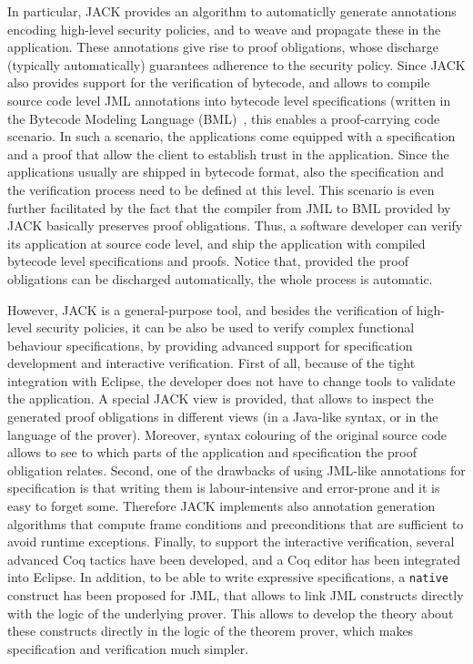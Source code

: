 In particular, JACK provides an algorithm to automaticlly generate
annotations encoding high-level security policies, and to weave and
propagate these in the application. These annotations give rise to
proof obligations, whose discharge (typically automatically)
guarantees adherence to the security policy. Since JACK also provides
support for the verification of bytecode, and allows to compile source
code level JML annotations into bytecode level specifications (written
in the Bytecode Modeling Language (BML)~\cite{BurdyHP07}, this enables
a proof-carrying code scenario. In such a scenario, the applications
come equipped with a specification and a proof that allow the client
to establish trust in the application. Since the applications usually
are shipped in bytecode format, also the specification and the
verification process need to be defined at this level. This scenario
is even further facilitated by the fact that the compiler from JML to
BML provided by JACK basically preserves proof obligations. Thus, a
software developer can verify its application at source code level,
and ship the application with compiled bytecode level specifications
and proofs. Notice that, provided the proof obligations can be
discharged automatically, the whole process is automatic.

However, JACK is a general-purpose tool, and besides the verification
of high-level security policies, it can be also be used to verify
complex functional behaviour specifications, by providing advanced
support for specification development and interactive
verification. First of all, because of the tight integration with
Eclipse, the developer does not have to change tools to validate the
application. A special JACK view is provided, that allows to inspect
the generated proof obligations in different views (in a Java-like
syntax, or in the language of the prover). Moreover, syntax colouring
of the original source code allows to see to which parts of the
application and specification the proof obligation relates. Second,
one of the drawbacks of using JML-like annotations for specification
is that writing them is labour-intensive and error-prone and it is
easy to forget some. Therefore JACK implements also annotation
generation algorithms that compute frame conditions and preconditions
that are sufficient to avoid runtime exceptions. Finally, to support
the interactive verification, several advanced Coq tactics have been
developed, and a Coq editor has been integrated into Eclipse. In
addition, to be able to write expressive specifications, a
\texttt{native} construct has been proposed for JML, that allows to
link JML constructs directly with the logic of the underlying
prover. This allows to develop the theory about these constructs
directly in the logic of the theorem prover, which makes specification
and verification much simpler.


